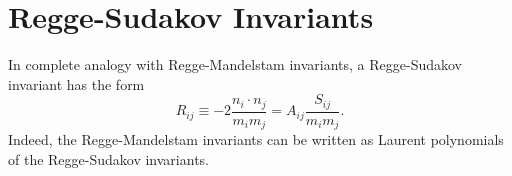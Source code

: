 \section{Regge-Sudakov Invariants}
In complete analogy with Regge-Mandelstam invariants, a Regge-Sudakov invariant has the form
\begin{equation}
	R_{ij} \equiv -2 \frac{n_{i} \cdot n_{j}}{m_{i} m_{j}} = A_{ij} \frac{S_{ij}}{m_{i} m_{j}}.
\end{equation}
Indeed, the Regge-Mandelstam invariants can be written as Laurent polynomials of the Regge-Sudakov invariants.
